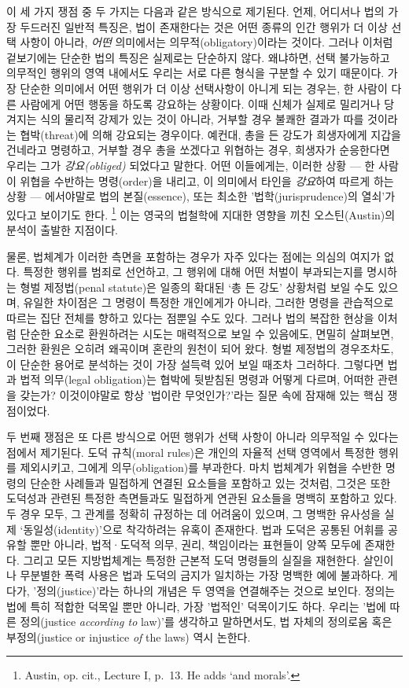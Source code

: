 \documentclass[12pt, oneside]{book}  %
\begin{document}
이 세 가지 쟁점 중 두 가지는 다음과 같은 방식으로 제기된다. 언제,
어디서나 법의 가장 두드러진 일반적 특징은, 법이 존재한다는 것은 어떤
종류의 인간 행위가 더 이상 선택 사항이 아니라, \emph{어떤} 의미에서는
의무적(obligatory)이라는 것이다. 그러나 이처럼 겉보기에는 단순한 법의
특징은 실제로는 단순하지 않다. 왜냐하면, 선택 불가능하고 의무적인 행위의
영역 내에서도 우리는 서로 다른 형식을 구분할 수 있기 때문이다. 가장
단순한 의미에서 어떤 행위가 더 이상 선택사항이 아니게 되는 경우는, 한
사람이 다른 사람에게 어떤 행동을 하도록 강요하는 상황이다. 이때 신체가
실제로 밀리거나 당겨지는 식의 물리적 강제가 있는 것이 아니라, 거부할
경우 불쾌한 결과가 따를 것이라는 협박(threat)에 의해 강요되는 경우이다.
예컨대, 총을 든 강도가 희생자에게 지갑을 건네라고 명령하고, 거부할 경우
총을 쏘겠다고 위협하는 경우, 희생자가 순응한다면 우리는 그가
\emph{강요(obliged)} 되었다고 말한다. 어떤 이들에게는, 이러한 상황 ---
한 사람이 위협을 수반하는 명령(order)을 내리고, 이 의미에서 타인을
\emph{강요}하여 따르게 하는 상황 --- 에서야말로 법의 본질(essence), 또는
최소한 '법학(jurisprudence)의 열쇠'가 있다고 보이기도 한다. \footnote{Austin,
  op. cit., Lecture I, p.~13. He adds `and morals'.} 이는 영국의
법철학에 지대한 영향을 끼친 오스틴(Austin)의 분석이 출발한 지점이다.

물론, 법체계가 이러한 측면을 포함하는 경우가 자주 있다는 점에는 의심의
여지가 없다. 특정한 행위를 범죄로 선언하고, 그 행위에 대해 어떤 처벌이
부과되는지를 명시하는 형벌 제정법(penal statute)은 일종의 확대된 `총 든
강도' 상황처럼 보일 수도 있으며, 유일한 차이점은 그 명령이 특정한
개인에게가 아니라, 그러한 명령을 관습적으로 따르는 집단 전체를 향하고
있다는 점뿐일 수도 있다. 그러나 법의 복잡한 현상을 이처럼 단순한 요소로
환원하려는 시도는 매력적으로 보일 수 있음에도, 면밀히 살펴보면, 그러한
환원은 오히려 왜곡이며 혼란의 원천이 되어 왔다. 형벌 제정법의
경우조차도, 이 단순한 용어로 분석하는 것이 가장 설득력 있어 보일 때조차
그러하다. 그렇다면 법과 법적 의무(legal obligation)는 협박에 뒷받침된
명령과 어떻게 다르며, 어떠한 관련을 갖는가? 이것이야말로 항상 '법이란
무엇인가?'라는 질문 속에 잠재해 있는 핵심 쟁점이었다.

두 번째 쟁점은 또 다른 방식으로 어떤 행위가 선택 사항이 아니라 의무적일
수 있다는 점에서 제기된다. 도덕 규칙(moral rules)은 개인의 자율적 선택
영역에서 특정한 행위를 제외시키고, 그에게 의무(obligation)를 부과한다.
마치 법체계가 위협을 수반한 명령의 단순한 사례들과 밀접하게 연결된
요소들을 포함하고 있는 것처럼, 그것은 또한 도덕성과 관련된 특정한
측면들과도 밀접하게 연관된 요소들을 명백히 포함하고 있다. 두 경우 모두,
그 관계를 정확히 규정하는 데 어려움이 있으며, 그 명백한 유사성을 실제
`동일성(identity)'으로 착각하려는 유혹이 존재한다. 법과 도덕은 공통된
어휘를 공유할 뿐만 아니라, 법적·도덕적 의무, 권리, 책임이라는 표현들이
양쪽 모두에 존재한다. 그리고 모든 지방법체계는 특정한 근본적 도덕
명령들의 실질을 재현한다. 살인이나 무분별한 폭력 사용은 법과 도덕의
금지가 일치하는 가장 명백한 예에 불과하다. 게다가, '정의(justice)'라는
하나의 개념은 두 영역을 연결해주는 것으로 보인다. 정의는 법에 특히
적합한 덕목일 뿐만 아니라, 가장 '법적인' 덕목이기도 하다. 우리는 '법에
따른 정의(justice \emph{according to} law)'를 생각하고 말하면서도, 법
자체의 정의로움 혹은 부정의(justice or injustice \emph{of} the laws)
역시 논한다.
\end{document}
